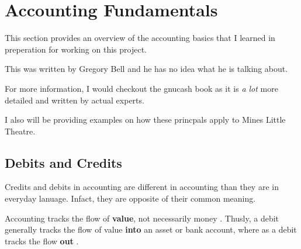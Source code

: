 \newcommand{\JournalEntry}[5]{%
    \begin{tabular}{|l l l|}
        \hline
        \multicolumn{3}{|c|}{\textbf{Entry \##1}}\\
        \hline
        Account & Debit & Credit\\
        \hline
        #2 &  & #4\\
        #3 & #5 & \\
        \hline
    \end{tabular}
}

\newcommand{\TChart}[3]{%
    \begin{tabular}{c|c}
        \multicolumn{2}{c}{\textbf{#1}}\\
        \hline
        Credits & Debits\\
        #2 & #3
    \end{tabular}

}




\chapter{Accounting Fundamentals}

This section provides an overview of the accounting basics that I learned in preperation for working on this project.

This was written by Gregory Bell and he has no idea what he is talking about.

For more information, I would checkout the gnucash book as it is \textit{a lot} more detailed and written by actual experts.

I also will be providing examples on how these princpals apply to Mines Little Theatre.

\section{Debits and Credits}

Credits and debits in accounting are different in accounting than they are in everyday lanuage. Infact, they are opposite of their common meaning.

Accounting tracks the flow of \textbf{value}, not necessarily money \cite{NetsuiteDebitsCredit}. 
Thusly, a debit generally tracks the flow of value \textbf{into} an asset or bank account, where as a debit tracks the flow \textbf{out} \cite{NetsuiteDebitsCredit}.

